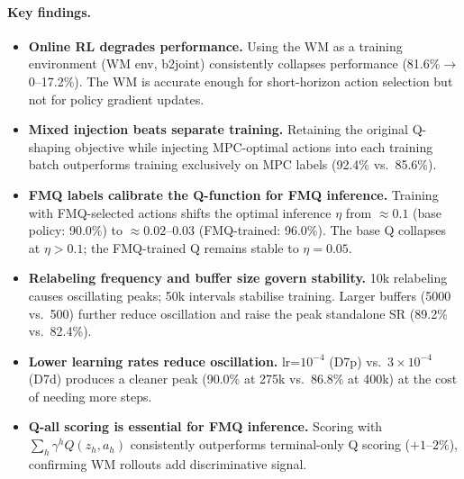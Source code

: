 \documentclass[11pt]{article}
\begin{document}
\paragraph{Key findings.}
\begin{itemize}
\item \textbf{Online RL degrades performance.} Using the WM as a training environment
      (WM env, b2joint) consistently collapses performance (81.6\%$\to$0--17.2\%).
      The WM is accurate enough for short-horizon action selection but not for
      policy gradient updates.
\item \textbf{Mixed injection beats separate training.} Retaining the original Q-shaping
      objective while injecting MPC-optimal actions into each training batch outperforms
      training exclusively on MPC labels (92.4\% vs.\ 85.6\%).
\item \textbf{FMQ labels calibrate the Q-function for FMQ inference.}
      Training with FMQ-selected actions shifts the optimal inference $\eta$ from
      $\approx0.1$ (base policy: 90.0\%) to $\approx0.02$--$0.03$ (FMQ-trained: 96.0\%).
      The base Q collapses at $\eta>0.1$; the FMQ-trained Q remains stable to $\eta=0.05$.
\item \textbf{Relabeling frequency and buffer size govern stability.}
      10k relabeling causes oscillating peaks; 50k intervals stabilise training.
      Larger buffers (5000 vs.\ 500) further reduce oscillation and raise the peak
      standalone SR (89.2\% vs.\ 82.4\%).
\item \textbf{Lower learning rates reduce oscillation.}
      lr=$10^{-4}$ (D7p) vs.\ $3\times10^{-4}$ (D7d) produces a cleaner peak (90.0\%
      at 275k vs.\ 86.8\% at 400k) at the cost of needing more steps.
\item \textbf{Q-all scoring is essential for FMQ inference.}
      Scoring with $\sum_h \gamma^h Q(z_h, a_h)$ consistently outperforms terminal-only
      Q scoring ($+1$--$2\%$), confirming WM rollouts add discriminative signal.
\end{itemize}
\end{document}
